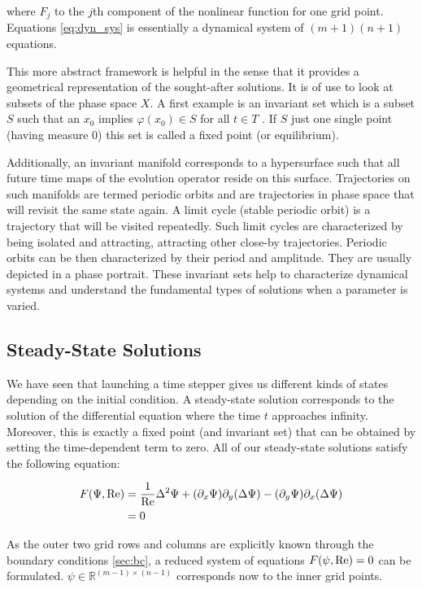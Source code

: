 where $F_j$ to the $j$th component of the nonlinear function for one grid point.
Equations \eqref{eq:dyn_sys} is essentially a dynamical system of $(m+1)(n+1)$
equations.

This more abstract framework is helpful in the sense that it provides a
geometrical representation of the sought-after solutions. It is of use to look
at subsets of the phase space $X$. A first example is an invariant set which is
a subset $S$ such that an $x_0$ implies $\varphi(x_0) \in S$ for all $t \in
T$ \citep{kuznetsov2004}. If $S$ just one single point (having measure 0) this
set is called a fixed point (or equilibrium). 

Additionally, an invariant manifold corresponds to a hypersurface such that all
future time maps of the evolution operator reside on this surface. Trajectories
on such manifolds are termed periodic orbits and are trajectories in phase
space that will revisit the same state again. A limit cycle (stable periodic
orbit) is a trajectory that will be visited repeatedly. Such limit cycles are
characterized by being isolated and attracting, attracting other close-by
trajectories. Periodic orbits can be then characterized by their period and
amplitude. They are usually depicted in a phase portrait. These invariant sets
help to characterize dynamical systems and understand the fundamental types of
solutions when a parameter is varied.

\subsection{Steady-State Solutions}

We have seen that launching a time stepper gives us different kinds of states
depending on the initial condition. A steady-state solution corresponds to the
solution of the differential equation where the time $t$ approaches infinity.
Moreover, this is exactly a fixed point (and invariant set) that can be
obtained by setting the time-dependent term to zero. All of our steady-state
solutions satisfy the following equation:

\begin{align}
  F(\Psi, \mathrm{Re}) & = \frac{1}{\mathrm{Re}}\Delta^2 \Psi +
    (\partial_x \Psi) \partial_y(\Delta \Psi) -
    (\partial_y \Psi) \partial_x(\Delta \Psi) \nonumber \\
  & =  0 \label{eq:str_steady}
\end{align}

As the outer two grid rows and columns are explicitly known through the
boundary conditions \ref{sec:bc}, a reduced system of equations $F(\psi, \mathrm{Re})
= 0$ can be formulated. $\psi \in \mathbb{R}^{(m-1)\times(n-1)} $ corresponds
now to the inner grid points. 

